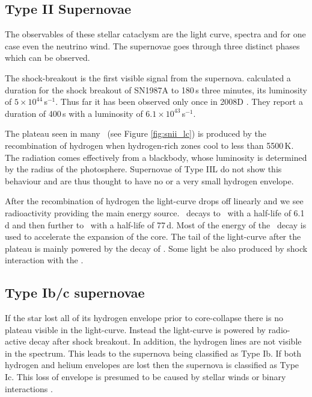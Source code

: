 \subsection{Type II Supernovae}
The observables of these stellar cataclysm are the light curve, spectra and for one case even the neutrino wind. The supernovae goes through three distinct phases which can be observed. 

The shock-breakout is the first visible signal from the supernova.  \cite{1992ApJ...393..742E} calculated a duration for the  shock breakout of SN1987A to 180\,s three minutes, its  luminosity of $5\times10^{44}$\erg\,s$^{-1}$. 
Thus far it has been observed only once in 2008D \citep{2008Natur.453..469S}. They report a duration of 400\,s with a luminosity of $6.1\times10^{43}$\erg\,s$^{-1}$.

The plateau seen in many \snii\ (see Figure \ref{fig:snii_lc}) is produced by the recombination of hydrogen when hydrogen-rich zones cool to less than 5500\,K. The radiation comes effectively from a blackbody, whose luminosity is determined  by the radius of the photosphere.
Supernovae of Type IIL do not show this behaviour and are thus thought to have no or a very small hydrogen envelope.


After the recombination of hydrogen the light-curve drops off linearly and we see radioactivity providing the main energy source. \Ni\ decays to \Co\ with a half-life of 6.1\,d and then further to \Fe\ with a half-life of 77\,d. Most of the energy of the \Ni\ decay is used to accelerate the expansion of the core. The tail of the light-curve after the plateau is mainly powered by the decay of \Co. Some light be also produced by shock interaction with the \csm.





\subsection{Type Ib/c supernovae}
If the star lost all of its hydrogen envelope prior to core-collapse there is no plateau visible in the light-curve. Instead the light-curve is powered by radio-active decay after shock breakout. In addition, the hydrogen lines are not visible in the spectrum. This leads to the supernova being classified as Type Ib. If both hydrogen and helium envelopes are lost then the supernova is classified as Type Ic. 
This loss of envelope is presumed to be caused by stellar winds or binary interactions \citep{1992ApJ...391..246P}. 



